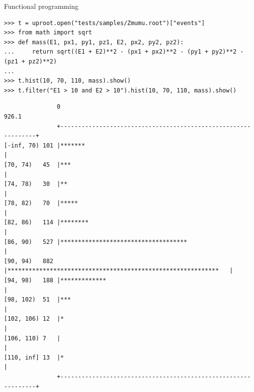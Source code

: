 \documentclass[aspectratio=169]{beamer}
\begin{document}
\begin{frame}[fragile]{Functional programming}
\vspace{0.25 cm}
\scriptsize
\begin{verbatim}
>>> t = uproot.open("tests/samples/Zmumu.root")["events"]
>>> from math import sqrt
>>> def mass(E1, px1, py1, pz1, E2, px2, py2, pz2):
...     return sqrt((E1 + E2)**2 - (px1 + px2)**2 - (py1 + py2)**2 - (pz1 + pz2)**2)
... 
>>> t.hist(10, 70, 110, mass).show()
>>> t.filter("E1 > 10 and E2 > 10").hist(10, 70, 110, mass).show()
\end{verbatim}
\begin{verbatim}
               0                                                           926.1
               +---------------------------------------------------------------+
[-inf, 70) 101 |*******                                                        |
[70, 74)   45  |***                                                            |
[74, 78)   30  |**                                                             |
[78, 82)   70  |*****                                                          |
[82, 86)   114 |********                                                       |
[86, 90)   527 |************************************                           |
[90, 94)   882 |************************************************************   |
[94, 98)   188 |*************                                                  |
[98, 102)  51  |***                                                            |
[102, 106) 12  |*                                                              |
[106, 110) 7   |                                                               |
[110, inf] 13  |*                                                              |
               +---------------------------------------------------------------+
\end{verbatim}
\end{frame}
\end{document}
